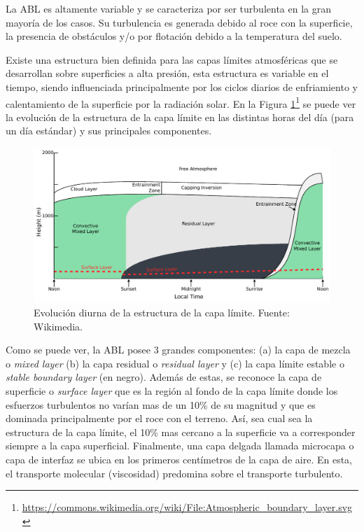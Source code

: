 La ABL es altamente variable y se caracteriza por ser turbulenta en la gran mayoría de los casos. Su turbulencia es generada debido al roce con la superficie, la presencia de obstáculos y/o por flotación debido a la temperatura del suelo. 

Existe una estructura bien definida para las capas límites atmosféricas que se desarrollan sobre superficies a alta presión, esta estructura es variable en el tiempo, siendo influenciada principalmente por los ciclos diarios de enfriamiento y calentamiento de la superficie por la radiación solar. En la Figura \ref{fig:03_abl}\footnote{\url{https://commons.wikimedia.org/wiki/File:Atmospheric\_boundary\_layer.svg}} se puede ver la evolución de la estructura de la capa límite en las distintas horas del día (para un día estándar) y sus principales componentes.

\begin{figure}[h!]
	\centering
	\includegraphics[width=0.98\linewidth,trim={0cm 0cm 0cm 0cm},clip]{Imagenes/03/abl}
	\caption{Evolución diurna de la estructura de la capa límite. Fuente: Wikimedia.}
	\label{fig:03_abl}
\end{figure}

Como se puede ver, la ABL posee 3 grandes componentes: (a) la capa de mezcla o \emph{mixed layer} (b) la capa residual o \emph{residual layer} y (c) la capa límite estable o \emph{stable boundary layer} (en negro). Además de estas, se reconoce la capa de superficie o \emph{surface layer} que es la región al fondo de la capa límite donde los esfuerzos turbulentos no varían mas de un 10\% de su magnitud y que es dominada principalmente por el roce con el terreno. Así, sea cual sea la estructura de la capa límite, el 10\% mas cercano a la superficie va a corresponder siempre a la capa superficial. Finalmente, una capa delgada llamada microcapa o capa de interfaz se ubica en los primeros centímetros de la capa de aire. En esta, el transporte molecular (viscosidad) predomina sobre el transporte turbulento.

